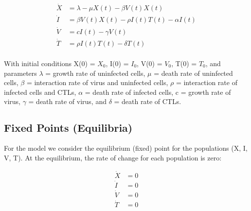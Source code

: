 \documentclass{article}
\begin{document}
\begin{equation}
\begin{split}
	\dot X &= \lambda - \mu X(t) - \beta V(t)X(t) \\
	\dot I &= \beta V(t)X(t) - \rho I(t)T(t) - \alpha I(t) \\
	\dot V &= cI(t) - \gamma V(t) \\
	\dot T &= \rho I(t)T(t) - \delta T(t) \\
\end{split}
\end{equation}

With initial conditions X(0) = $X_{0}$, I(0) = $I_{0}$, V(0) = $V_{0}$, T(0) = $T_{0}$, and parameters $\lambda$ = growth rate of uninfected cells, $\mu$ = death rate of uninfected cells, $\beta$ = interaction rate of virus and uninfected cells, $\rho$ = interaction rate of infected cells and CTLs, $\alpha$ = death rate of infected cells, c = growth rate of virus, $\gamma$ = death rate of virus, and $\delta$ = death rate of CTLs.

\subsection{Fixed Points (Equilibria)}

For the model we consider the equilibrium (fixed) point for the populations (X, I, V, T). At the equilibrium, the rate of change for each population is zero:

\begin{equation}
	\begin{split}
		\dot X &= 0 \\
		\dot I &= 0 \\
		\dot V &= 0 \\
		\dot T &= 0 \\
	\end{split}
\end{equation}
\end{document}
